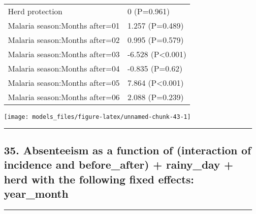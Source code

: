 \documentclass[]{article}
\begin{document}
\begin{longtable}[t]{ll}
\hspace{1em}Herd protection & 0 (P=0.961)\\
\hspace{1em}Malaria season:Months after=01 & 1.257 (P=0.489)\\
\hspace{1em}Malaria season:Months after=02 & 0.995 (P=0.579)\\
\hspace{1em}Malaria season:Months after=03 & -6.528 (P<0.001)\\
\hspace{1em}Malaria season:Months after=04 & -0.835 (P=0.62)\\
\hspace{1em}Malaria season:Months after=05 & 7.864 (P<0.001)\\
\hspace{1em}Malaria season:Months after=06 & 2.088 (P=0.239)\\*
\end{longtable}

\begin{center}\texttt{[image: models\_files/figure-latex/unnamed-chunk-43-1]} \end{center}

\newpage

\begin{center}\rule{0.5\linewidth}{\linethickness}\end{center}

\subsection{35. Absenteeism as a function of (interaction of incidence
and before\_after) + rainy\_day + herd with the following fixed effects:
year\_month}\label{absenteeism-as-a-function-of-interaction-of-incidence-and-before_after-rainy_day-herd-with-the-following-fixed-effects-year_month}

\begin{center}\rule{0.5\linewidth}{\linethickness}\end{center}
\end{document}
